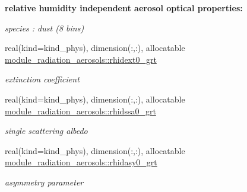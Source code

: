 \begin{Indent}\textbf{ relative humidity independent aerosol optical properties\+:}\par
{\em species \+: dust (8 bins) }\begin{DoxyCompactItemize}
\item 
real(kind=kind\+\_\+phys), dimension(\+:,\+:), allocatable \hyperlink{group__module__radiation__aerosols_ga6683021bded82850053c16eb3e906998}{module\+\_\+radiation\+\_\+aerosols\+::rhidext0\+\_\+grt}
\begin{DoxyCompactList}\small\item\em extinction coefficient \end{DoxyCompactList}\item 
real(kind=kind\+\_\+phys), dimension(\+:,\+:), allocatable \hyperlink{group__module__radiation__aerosols_gaea46db63db26a316e73640bc63f75383}{module\+\_\+radiation\+\_\+aerosols\+::rhidssa0\+\_\+grt}
\begin{DoxyCompactList}\small\item\em single scattering albedo \end{DoxyCompactList}\item 
real(kind=kind\+\_\+phys), dimension(\+:,\+:), allocatable \hyperlink{group__module__radiation__aerosols_ga8491a714c86e9bd7ebdc401662f5068e}{module\+\_\+radiation\+\_\+aerosols\+::rhidasy0\+\_\+grt}
\begin{DoxyCompactList}\small\item\em asymmetry parameter \end{DoxyCompactList}\end{DoxyCompactItemize}
\end{Indent}
